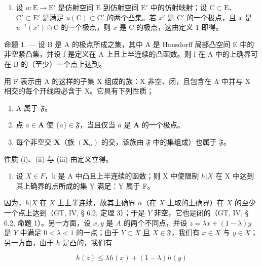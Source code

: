 \begin{enumerate}
\def\labelenumi{\arabic{enumi})}
\setcounter{enumi}{2}
\tightlist
\item
  设 \(u: \mathrm{E} \to \mathrm{E}'\) 是仿射空间 \(\mathrm{E}\) 到仿射空间 \(\mathrm{E}'\) 中的仿射映射；设 \(\mathrm{C} \subset \mathrm{E}\)、\(\mathrm{C}' \subset \mathrm{E}'\) 是满足 \(u(\mathrm{C}) \subset \mathrm{C}'\) 的两个凸集。若 \(x'\) 是 \(\mathrm{C}'\) 的一个极点，且 \(x\) 是 \(u^{-1}(x') \cap \mathrm{C}\) 的一个极点，则 \(x\) 是 \(\mathrm{C}\) 的极点，这由定义 1 即得。
\end{enumerate}

命题 1. --- 设 B 是 A 的极点所成之集，其中 A 是 Hausdorff 局部凸空间 E 中的非空紧凸集，并设 f 是定义在 A 上且上半连续的凸函数。则 f 在 A 中的上确界可在 B 的（至少）一个点上达到。

用 F 表示由 A 的这样的子集 X 组成的族：X 非空、闭，且包含在 A 中并与 X 相交的每个开线段必含于 X。它具有下列性质；

\begin{enumerate}
\def\labelenumi{(\roman{enumi})}
\item
  A 属于 \(\mathfrak{F}\)。
\item
  点 \(a \in \mathbf{A}\) 使 \(\{a\} \in \mathfrak{F}\)，当且仅当 \(a\) 是 \(\mathbf{A}\) 的一个极点。
\item
  每个非空交 \(\mathbf{X}\)（族 \((\mathbf{X}_{\alpha})\) 的交，该族由 \(\mathfrak{F}\) 中的集组成）也属于 \(\mathfrak{F}\)。
\end{enumerate}

性质 (i)、(ii) 与 (iii) 由定义立得。

\begin{enumerate}
\def\labelenumi{(\roman{enumi})}
\setcounter{enumi}{3}
\tightlist
\item
  设 \(X \in F\)，h 是 A 中凸且上半连续的函数；则 X 中使限制 \(h|X\) 在 X 中达到其上确界的点所成的集 Y 满足：Y 属于 F。
\end{enumerate}

因为，\(h|X\) 在 \(X\) 上上半连续，故其上确界 \(\alpha\)（在 \(X\) 上取的上确界）在 \(X\) 的至少一个点上达到（GT, IV, § 6.2, 定理 3）；于是 \(Y\) 非空，它也是闭的（GT, IV, § 6.2, 命题 1）。另一方面，设 \(x, y\) 是 \(A\) 的两个不同点，并设 \(z = \lambda x + (1 - \lambda)y\) 是 \(Y\) 中满足 \(0 < \lambda < 1\) 的一点；由于 \(Y \subset X\) 且 \(X \in \mathfrak{F}\)，我们有 \(x \in X\) 与 \(y \in X\)；另一方面，由于 \(h\) 是凸的，我们有

\[
h (z) \leqslant \lambda h (x) + (1 - \lambda) h (y)
\]

